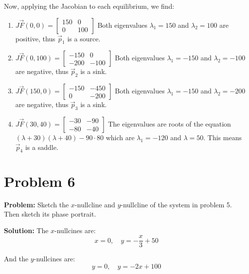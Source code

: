 \documentclass{article}
\begin{document}
Now, applying the Jacobian to each equilibrium, we find:
\begin{enumerate}[label=\alph*)]
  \item $J\vec F(0,0)=\begin{bmatrix}
    150 & 0\\
    0 & 100
  \end{bmatrix}$ Both eigenvalues $\lambda_1=150$ and $\lambda_2=100$ are positive, thus $\vec p_1$ is a source.
  \item $J\vec F(0,100)=\begin{bmatrix}
    -150 & 0\\
    -200 & -100
  \end{bmatrix}$ Both eigenvalues $\lambda_1=-150$ and $\lambda_2=-100$ are negative, thus $\vec p_2$ is a sink.
  \item $J\vec F(150,0)=\begin{bmatrix}
    -150 & -450\\
    0 & -200
  \end{bmatrix}$ Both eigenvalues $\lambda_1=-150$ and $\lambda_2=-200$ are negative, thus $\vec p_3$ is a sink.
  \item $J\vec F(30,40)=\begin{bmatrix}
    -30 & -90\\
    -80 & -40
  \end{bmatrix}$ The eigenvalues are roots of the equation $(\lambda+30)(\lambda+40)-90\cdot80$ which are $\lambda_1=-120$ and $\lambda=50$. This means $\vec p_4$ is a saddle.
\end{enumerate}

\section*{Problem 6}
\noindent\textbf{Problem:} Sketch the $x$-nullcline and $y$-nullcline of the system in problem 5. Then sketch its phase portrait.
\bigskip

\noindent\textbf{Solution:} The $x$-nullcines are:
\begin{equation*}
  x=0,\quad y=-\frac{x}{3}+50
\end{equation*}

And the $y$-nullcines are:
\begin{equation*}
  y=0,\quad y=-2x+100
\end{equation*}
\end{document}

